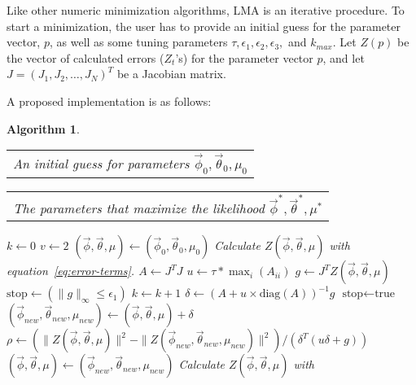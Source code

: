 \documentclass[english,12pt]{article}
\theoremstyle{algorithm}
\newtheorem{algorithm}{Algorithm}[section]
\newlength{\alglabelwidth}
\newcommand{\alginput}[1]{%
		\par\noindent%
		\settowidth{\alglabelwidth}{\emph{Output:}}%
		\makebox[\alglabelwidth][l]{\emph{Input:}} \begin{tabular}[t]{l} #1 \end{tabular}}
\newcommand{\algoutput}[1]{%
		\par\noindent%
		\settowidth{\alglabelwidth}{\emph{Output:}}%
		\makebox[\alglabelwidth][l]{\emph{Output:}} \begin{tabular}[t]{l} #1 \end{tabular}}
\begin{document}
Like other numeric minimization algorithms, LMA is an iterative
procedure.  To start a minimization, the user has to provide an
initial guess for the parameter vector, $p$, as well as some tuning
parameters $\tau, \epsilon_1, \epsilon_2, \epsilon_3,$ and $k_{max}$.
Let $Z(p)$ be the vector of calculated errors ($Z_t$'s) for the
parameter vector $p$, and let $J = (J_{1}, J_{2}, \dots, J_N)^T$
be a Jacobian matrix.

A proposed implementation is as follows:

\begin{algorithm}
\alginput{An initial guess for parameters $\vec{\phi}_0, \vec{\theta}_0, \mu_0$}
\algoutput{The parameters that maximize the likelihood $\vec{\phi}^*,
  \vec{\theta}^*, \mu^*$}
\begin{algorithmic}[1]
	\State $k \leftarrow 0$  
	\State $v \leftarrow 2$ 
	\State $(\vec{\phi},\vec{\theta},\mu) \leftarrow (\vec{\phi}_0,\vec{\theta}_0,\mu_0)$ 
    \State Calculate $Z(\vec{\phi},\vec{\theta},\mu)$ with
    equation~\ref{eq:error-terms}.  
	\State $A \leftarrow J^T J$   
	\State $u \leftarrow \tau * \max_i(A_{ii})$ 
	\State $g \leftarrow J^T Z(\vec{\phi},\vec{\theta},\mu)$ 
	\State $ \text{stop} \leftarrow (\|g\|_{\infty} \le \epsilon_1)$ 
		\State $k \leftarrow k + 1$
		\Repeat
			\State $\delta \leftarrow (A + u \times \text{diag}(A))^{-1} g$ 
			 
				\State  $\text{stop} \leftarrow \text{true}$
			\Else
				\State $(\vec{\phi}_{new},\vec{\theta}_{new},\mu_{new}) \leftarrow (\vec{\phi},\vec{\theta},\mu) + \delta$ 
				\State $\rho \leftarrow (\| Z(\vec{\phi},\vec{\theta},\mu)\|^2 - \| Z(\vec{\phi}_{new},\vec{\theta}_{new},\mu_{new})\|^2 )/(\delta^T(u \delta + g))$ 
				 
					\State $(\vec{\phi},\vec{\theta},\mu) \leftarrow (\vec{\phi}_{new},\vec{\theta}_{new},\mu_{new})$ 
                    \State Calculate $Z(\vec{\phi},\vec{\theta},\mu)$ with

\end{algorithmic}
\end{algorithm}
\end{document}
